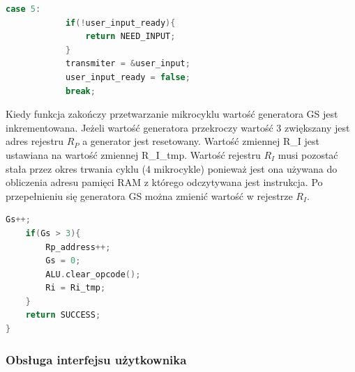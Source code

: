 \documentclass[../main.tex]{subfiles}
\begin{document}
\begin{lstlisting}[language=C++]
        case 5: 
            if(!user_input_ready){
                return NEED_INPUT;
            }
            transmiter = &user_input;
            user_input_ready = false;
            break;
\end{lstlisting}
\par
Kiedy funkcja zakończy przetwarzanie mikrocyklu wartość generatora GS jest inkrementowana. Jeżeli wartość generatora przekroczy wartość 3
zwiększany jest adres rejestru $R_P$ a generator jest resetowany. Wartość zmiennej R\_I jest ustawiana na wartość zmiennej R\_I\_tmp.
Wartość rejestru $R_I$ musi pozostać stała przez okres trwania cyklu (4 mikrocykle) ponieważ jest ona używana do obliczenia adresu pamięci RAM
z którego odczytywana jest instrukcja. Po przepełnieniu się generatora GS można zmienić wartość w rejestrze $R_I$.
 
\begin{lstlisting}[language=C++]
    Gs++;
    if(Gs > 3){
        Rp_address++;
        Gs = 0;
        ALU.clear_opcode();
        Ri = Ri_tmp;
    }
    return SUCCESS;
}
\end{lstlisting}

\par


\subsubsection{Obsługa interfejsu użytkownika}
\end{document}
